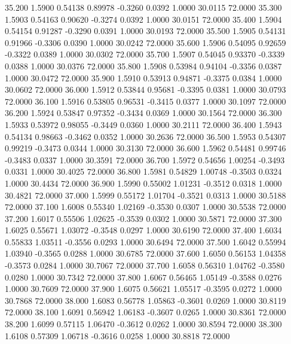   35.200   1.5900   0.54138   0.89978  -0.3260   0.0392   1.0000  30.0115  72.0000
  35.300   1.5903   0.54163   0.90620  -0.3274   0.0392   1.0000  30.0151  72.0000
  35.400   1.5904   0.54154   0.91287  -0.3290   0.0391   1.0000  30.0193  72.0000
  35.500   1.5905   0.54131   0.91966  -0.3306   0.0390   1.0000  30.0242  72.0000
  35.600   1.5906   0.54095   0.92659  -0.3322   0.0389   1.0000  30.0302  72.0000
  35.700   1.5907   0.54045   0.93370  -0.3339   0.0388   1.0000  30.0376  72.0000
  35.800   1.5908   0.53984   0.94104  -0.3356   0.0387   1.0000  30.0472  72.0000
  35.900   1.5910   0.53913   0.94871  -0.3375   0.0384   1.0000  30.0602  72.0000
  36.000   1.5912   0.53844   0.95681  -0.3395   0.0381   1.0000  30.0793  72.0000
  36.100   1.5916   0.53805   0.96531  -0.3415   0.0377   1.0000  30.1097  72.0000
  36.200   1.5924   0.53847   0.97352  -0.3434   0.0369   1.0000  30.1564  72.0000
  36.300   1.5933   0.53972   0.98055  -0.3449   0.0360   1.0000  30.2111  72.0000
  36.400   1.5943   0.54134   0.98663  -0.3462   0.0352   1.0000  30.2636  72.0000
  36.500   1.5953   0.54307   0.99219  -0.3473   0.0344   1.0000  30.3130  72.0000
  36.600   1.5962   0.54481   0.99746  -0.3483   0.0337   1.0000  30.3591  72.0000
  36.700   1.5972   0.54656   1.00254  -0.3493   0.0331   1.0000  30.4025  72.0000
  36.800   1.5981   0.54829   1.00748  -0.3503   0.0324   1.0000  30.4434  72.0000
  36.900   1.5990   0.55002   1.01231  -0.3512   0.0318   1.0000  30.4821  72.0000
  37.000   1.5999   0.55172   1.01704  -0.3521   0.0313   1.0000  30.5188  72.0000
  37.100   1.6008   0.55340   1.02169  -0.3530   0.0307   1.0000  30.5538  72.0000
  37.200   1.6017   0.55506   1.02625  -0.3539   0.0302   1.0000  30.5871  72.0000
  37.300   1.6025   0.55671   1.03072  -0.3548   0.0297   1.0000  30.6190  72.0000
  37.400   1.6034   0.55833   1.03511  -0.3556   0.0293   1.0000  30.6494  72.0000
  37.500   1.6042   0.55994   1.03940  -0.3565   0.0288   1.0000  30.6785  72.0000
  37.600   1.6050   0.56153   1.04358  -0.3573   0.0284   1.0000  30.7067  72.0000
  37.700   1.6058   0.56310   1.04762  -0.3580   0.0280   1.0000  30.7342  72.0000
  37.800   1.6067   0.56465   1.05149  -0.3588   0.0276   1.0000  30.7609  72.0000
  37.900   1.6075   0.56621   1.05517  -0.3595   0.0272   1.0000  30.7868  72.0000
  38.000   1.6083   0.56778   1.05863  -0.3601   0.0269   1.0000  30.8119  72.0000
  38.100   1.6091   0.56942   1.06183  -0.3607   0.0265   1.0000  30.8361  72.0000
  38.200   1.6099   0.57115   1.06470  -0.3612   0.0262   1.0000  30.8594  72.0000
  38.300   1.6108   0.57309   1.06718  -0.3616   0.0258   1.0000  30.8818  72.0000
